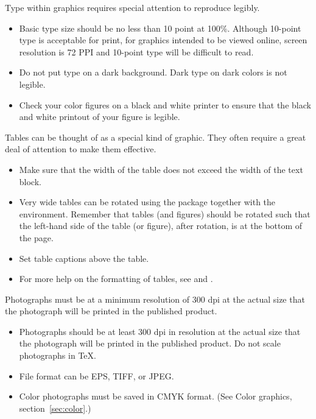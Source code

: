 
%
 {Type within graphics requires special attention to reproduce legibly.}

\begin{itemize}
\item Basic type size should be no less than 10 point at 100\%.
 Although 10-point type is acceptable for print, for graphics intended
 to be viewed online, screen resolution is 72 PPI and 10-point type
 will be difficult to read.
\item Do not put type on a dark background. 
 Dark type on dark colors is not legible.
\item Check your color figures on a black and white printer to ensure that
 the black and white printout of your figure is legible.
\end{itemize}

%
{Tables can be thought of as a special kind of graphic. They often require
 a great deal of attention to make them effective.}

\begin{itemize}

\item Make sure that the width of the table does not exceed the width of
 the text block.

\item Very wide tables can be rotated using the  package
 together with the  environment. Remember that tables
 (and figures) should be rotated such that the left-hand side of the table
 (or figure), after rotation, is at the bottom of the page.

\item Set table captions above the table.

\item For more help on the formatting of tables, see \cite[chapter 5]{MG}
 and \cite{voss-tbl}.
\end{itemize}

%
{Photographs must be at a minimum resolution of 300 dpi at the actual size
 that the photograph will be printed in the published product.}

\begin{itemize}
\item Photographs should be at least 300 dpi in resolution at the actual
 size that the photograph will be printed in the published product.  Do
 not scale photographs in \TeX.
\item File format can be EPS, TIFF, or JPEG.
\item Color photographs must be saved in CMYK format. (See Color graphics,
 section~\ref{sec:color}.)
\end{itemize}

